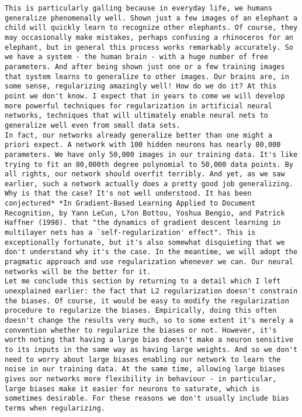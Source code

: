 \begin{lstlisting}
This is particularly galling because in everyday life, we humans generalize phenomenally well. Shown just a few images of an elephant a child will quickly learn to recognize other elephants. Of course, they may occasionally make mistakes, perhaps confusing a rhinoceros for an elephant, but in general this process works remarkably accurately. So we have a system - the human brain - with a huge number of free parameters. And after being shown just one or a few training images that system learns to generalize to other images. Our brains are, in some sense, regularizing amazingly well! How do we do it? At this point we don't know. I expect that in years to come we will develop more powerful techniques for regularization in artificial neural networks, techniques that will ultimately enable neural nets to generalize well even from small data sets.
In fact, our networks already generalize better than one might a priori expect. A network with 100 hidden neurons has nearly 80,000 parameters. We have only 50,000 images in our training data. It's like trying to fit an 80,000th degree polynomial to 50,000 data points. By all rights, our network should overfit terribly. And yet, as we saw earlier, such a network actually does a pretty good job generalizing. Why is that the case? It's not well understood. It has been conjectured* *In Gradient-Based Learning Applied to Document Recognition, by Yann LeCun, L?on Bottou, Yoshua Bengio, and Patrick Haffner (1998). that "the dynamics of gradient descent learning in multilayer nets has a `self-regularization' effect". This is exceptionally fortunate, but it's also somewhat disquieting that we don't understand why it's the case. In the meantime, we will adopt the pragmatic approach and use regularization whenever we can. Our neural networks will be the better for it.
Let me conclude this section by returning to a detail which I left unexplained earlier: the fact that L2 regularization doesn't constrain the biases. Of course, it would be easy to modify the regularization procedure to regularize the biases. Empirically, doing this often doesn't change the results very much, so to some extent it's merely a convention whether to regularize the biases or not. However, it's worth noting that having a large bias doesn't make a neuron sensitive to its inputs in the same way as having large weights. And so we don't need to worry about large biases enabling our network to learn the noise in our training data. At the same time, allowing large biases gives our networks more flexibility in behaviour - in particular, large biases make it easier for neurons to saturate, which is sometimes desirable. For these reasons we don't usually include bias terms when regularizing.

\end{lstlisting}
